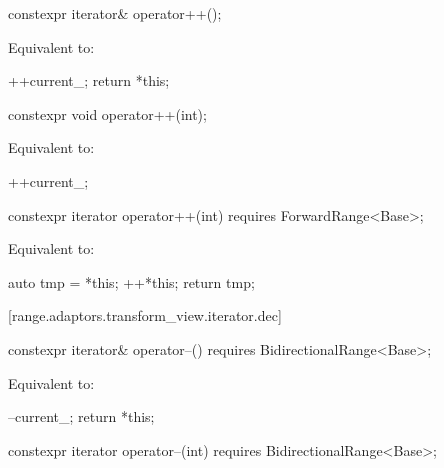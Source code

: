\begin{itemdecl}
constexpr iterator& operator++();
\end{itemdecl}

\begin{itemdescr}
\pnum
\effects Equivalent to:
\begin{codeblock}
++current_;
return *this;
\end{codeblock}
\end{itemdescr}

\begin{itemdecl}
constexpr void operator++(int);
\end{itemdecl}

\begin{itemdescr}
\pnum
\effects Equivalent to:
\begin{codeblock}
++current_;
\end{codeblock}
\end{itemdescr}

\begin{itemdecl}
constexpr iterator operator++(int) requires ForwardRange<Base>;
\end{itemdecl}

\begin{itemdescr}
\pnum
\effects Equivalent to:
\begin{codeblock}
auto tmp = *this;
++*this;
return tmp;
\end{codeblock}
\end{itemdescr}

[range.adaptors.transform_view.iterator.dec]{}

\begin{itemdecl}
constexpr iterator& operator--() requires BidirectionalRange<Base>;
\end{itemdecl}

\begin{itemdescr}
\pnum
\effects Equivalent to:
\begin{codeblock}
--current_;
return *this;
\end{codeblock}
\end{itemdescr}

\begin{itemdecl}
constexpr iterator operator--(int) requires BidirectionalRange<Base>;
\end{itemdecl}

